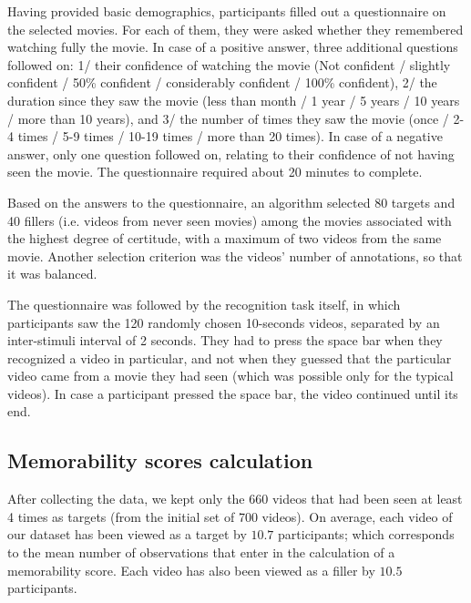 \documentclass[sigconf]{acmart}
\begin{document}
Having provided basic demographics, participants filled out a questionnaire on the selected movies.
For each of them, they were asked whether they remembered watching fully the movie.%
In case of a positive answer, three additional questions followed on: 1/ their confidence of watching the movie (Not confident / slightly confident / 50\% confident / considerably confident / 100\% confident), 2/ the duration since they saw the movie (less than month / 1 year / 5 years / 10 years / more than 10 years), and 3/ the number of times they saw the movie (once / 2-4 times / 5-9 times / 10-19 times / more than 20 times).
In case of a negative answer, only one question followed on, relating to their confidence of not having seen the movie.
The questionnaire required about 20 minutes to complete.

Based on the answers to the questionnaire, an algorithm selected 80 targets and 40 fillers (i.e. videos from never seen movies) among the movies associated with the highest degree of certitude, with a maximum of two videos from the same movie.
Another selection criterion was the videos' number of annotations, so that it was balanced.

The questionnaire was followed by the recognition task itself, in which participants saw the 120 randomly chosen 10-seconds videos, separated by an inter-stimuli interval of 2 seconds.
They had to press the space bar when they recognized a video in particular, and not when they guessed that the particular video came from a movie they had seen (which was possible only for the typical videos).
In case a participant pressed the space bar, the video continued until its end.

\subsection{Memorability scores calculation}
After collecting the data, we kept only the 660 videos that had been seen at least 4 times as targets (from the initial set of 700 videos).
On average, each video of our dataset has been viewed as a target by $10.7$ participants; which corresponds to the mean number of observations that enter in the calculation of a memorability score.
Each video has also been viewed as a filler by $10.5$ participants.
\end{document}
